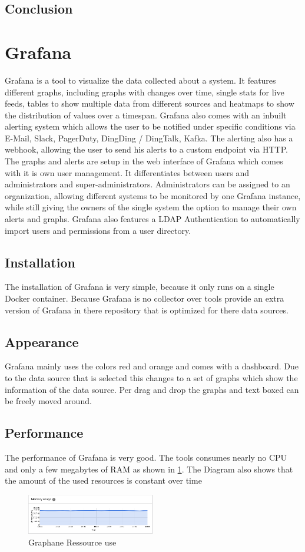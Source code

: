 \subsection{Conclusion}


\section{Grafana}
\label{grafana} %
Grafana is a tool to visualize the data collected about a system. It features different graphs, including graphs with changes over time, single stats for live feeds, tables to show multiple data from different sources and heatmaps to show the distribution of values over a timespan.
Grafana also comes with an inbuilt alerting system which allows the user to be notified under specific conditions via E-Mail, Slack, PagerDuty, DingDing / DingTalk, Kafka. The alerting also has a webhook, allowing the user to send his alerts to a custom endpoint via HTTP.
The graphs and alerts are setup in the web interface of Grafana which comes with it is own user management. It differentiates between users and administrators and super-administrators. Administrators can be assigned to an organization, allowing different systems to be monitored by one Grafana instance, while still giving the owners of the single system the option to manage their own alerts and graphs.
Grafana also features a LDAP Authentication to automatically import users and permissions from a user directory.
\subsection{Installation}
The installation of Grafana is very simple, because it only runs on a single Docker container. Because Grafana is no collector over tools provide an extra version of Grafana in there repository that is optimized for there data sources.
\subsection{Appearance}%
Grafana mainly uses the colors red and orange and comes with a dashboard. Due to the data source that is selected this changes to a set of graphs which show the information of the data source. Per drag and drop the graphs and text boxed can be freely moved around. 
\subsection{Performance}
The performance of Grafana is very good. The tools consumes nearly no CPU and only a few megabytes of RAM as shown in \cref{fig:Grafan_RAM}. The Diagram also shows that the amount of the used resources is constant over time
\begin{figure}
\centering
\includegraphics[width=0.5\textwidth]{Bilder/Performance/Grafan_RAM}
\caption{Graphane Ressource use}
\label{fig:Grafan_RAM}
\end{figure}
